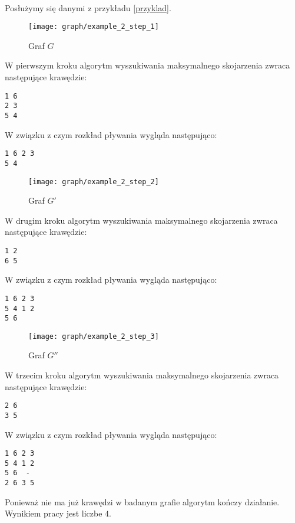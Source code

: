 \documentclass{llncs}
\begin{document}
\begin{example}~\\
Posłużymy się danymi z przykładu \ref{przyklad}.
\begin{figure}[H]
  \caption{Graf $G$}
  \centering
	\texttt{[image: graph/example\_2\_step\_1]}
\end{figure}
W pierwszym kroku algorytm wyszukiwania maksymalnego skojarzenia zwraca następujące krawędzie:
\begin{lstlisting}[title=Maksymalne skojarzenie grafu $G$]
1 6
2 3
5 4
\end{lstlisting}
W związku z czym rozkład pływania wygląda następująco:
\begin{lstlisting}[title=Rozkład plywania po kroku pierwszym]
1 6	2 3
5 4	
\end{lstlisting}
\begin{figure}[H]
  \caption{Graf $G'$}
  \centering
	\texttt{[image: graph/example\_2\_step\_2]}
\end{figure}
W drugim kroku algorytm wyszukiwania maksymalnego skojarzenia zwraca następujące krawędzie:
\begin{lstlisting}[title=Maksymalne skojarzenie grafu $G'$]
1 2
6 5
\end{lstlisting}
W związku z czym rozkład pływania wygląda następująco:
\begin{lstlisting}[title=Rozkład plywania po kroku drugim]
1 6	2 3
5 4	1 2
5 6
\end{lstlisting}
\begin{figure}[H]
  \caption{Graf $G''$}
  \centering
	\texttt{[image: graph/example\_2\_step\_3]}
\end{figure}
W trzecim kroku algorytm wyszukiwania maksymalnego skojarzenia zwraca następujące krawędzie:
\begin{lstlisting}[title=Maksymalne skojarzenie grafu $G''$]
2 6
3 5
\end{lstlisting}
W związku z czym rozkład pływania wygląda następująco:
\begin{lstlisting}[title=Rozkład plywania po kroku trzecim]
1 6	2 3
5 4	1 2
5 6	 -
2 6	3 5
\end{lstlisting}
Ponieważ nie ma już krawędzi w badanym grafie algorytm kończy działanie. Wynikiem pracy jest
liczbe $4$.
\end{example}
\end{document}
